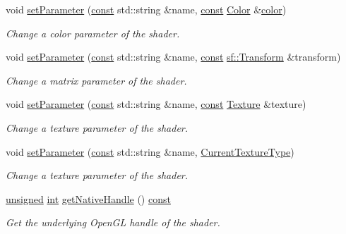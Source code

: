 \begin{DoxyCompactItemize}
void \hyperlink{classsf_1_1_shader_aa8618119ed4399df3fd33e78ee96b4fc}{set\-Parameter} (\hyperlink{term__entry_8h_a57bd63ce7f9a353488880e3de6692d5a}{const} std\-::string \&name, \hyperlink{term__entry_8h_a57bd63ce7f9a353488880e3de6692d5a}{const} \hyperlink{classsf_1_1_color}{Color} \&\hyperlink{_entity_8cpp_a864889304a90873adb9c6e289a54bcf4}{color})
\begin{DoxyCompactList}\small\item\em Change a color parameter of the shader. \end{DoxyCompactList}\item 
void \hyperlink{classsf_1_1_shader_a39c387cc30e249b22a0c478703b8cc9a}{set\-Parameter} (\hyperlink{term__entry_8h_a57bd63ce7f9a353488880e3de6692d5a}{const} std\-::string \&name, \hyperlink{term__entry_8h_a57bd63ce7f9a353488880e3de6692d5a}{const} \hyperlink{classsf_1_1_transform}{sf\-::\-Transform} \&transform)
\begin{DoxyCompactList}\small\item\em Change a matrix parameter of the shader. \end{DoxyCompactList}\item 
void \hyperlink{classsf_1_1_shader_a7f58ab5c0a1084f238dfcec86602daa1}{set\-Parameter} (\hyperlink{term__entry_8h_a57bd63ce7f9a353488880e3de6692d5a}{const} std\-::string \&name, \hyperlink{term__entry_8h_a57bd63ce7f9a353488880e3de6692d5a}{const} \hyperlink{classsf_1_1_texture}{Texture} \&texture)
\begin{DoxyCompactList}\small\item\em Change a texture parameter of the shader. \end{DoxyCompactList}\item 
void \hyperlink{classsf_1_1_shader_af06b4cba0bab915fa01032b063909044}{set\-Parameter} (\hyperlink{term__entry_8h_a57bd63ce7f9a353488880e3de6692d5a}{const} std\-::string \&name, \hyperlink{structsf_1_1_shader_1_1_current_texture_type}{Current\-Texture\-Type})
\begin{DoxyCompactList}\small\item\em Change a texture parameter of the shader. \end{DoxyCompactList}\item 
\hyperlink{curses_8priv_8h_aca40206900cfc164654362fa8d4ad1e6}{unsigned} \hyperlink{term__entry_8h_ad65b480f8c8270356b45a9890f6499ae}{int} \hyperlink{classsf_1_1_shader_ae205f2ced4bc9198a25b44f00e81c719}{get\-Native\-Handle} () \hyperlink{term__entry_8h_a57bd63ce7f9a353488880e3de6692d5a}{const} 
\begin{DoxyCompactList}\small\item\em Get the underlying Open\-G\-L handle of the shader. \end{DoxyCompactList}\item 

\end{DoxyCompactItemize}
